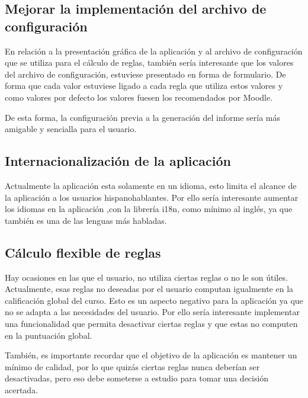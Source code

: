 \subsection{Mejorar la implementación del archivo de configuración}
En relación a la presentación gráfica de la aplicación y al archivo de configuración que se utiliza para el cálculo de reglas, también sería interesante que los valores del archivo de configuración, estuviese presentado en forma de formulario. De forma que cada valor estuviese ligado a cada regla que utiliza estos valores y como valores por defecto los valores fuesen los recomendados por Moodle. 

De esta forma, la configuración previa a la generación del informe sería más amigable y sencialla para el usuario.

\subsection{Internacionalización de la aplicación}
Actualmente la aplicación esta solamente en un idioma, esto limita el alcance de la aplicación a los usuarios hispanohablantes. Por ello sería interesante aumentar los idiomas en la aplicación ,con la librería i18n, como mínimo al inglés, ya que también es una de las lenguas más habladas. 

\subsection{Cálculo flexible de reglas}
Hay ocasiones en las que el usuario, no utiliza ciertas reglas o no le son útiles. Actualmente, esas reglas no deseadas por el usuario computan igualmente en la calificación global del curso. Esto es un aspecto negativo para la aplicación ya que no se adapta a las necesidades del usuario. Por ello sería interesante implementar una funcionalidad que permita desactivar ciertas reglas y que estas no computen en la puntuación global. 

También, es importante recordar que el objetivo de la aplicación es mantener un mínimo de calidad, por lo que quizás ciertas reglas nunca deberían ser desactivadas, pero eso debe someterse a estudio para tomar una decisión acertada.



